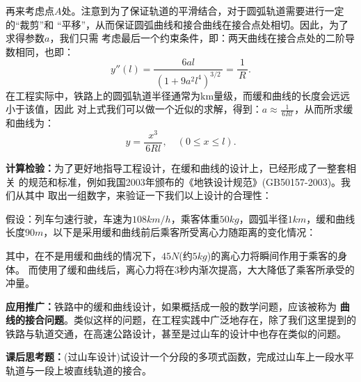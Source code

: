 \documentclass[a4paper]{article}
\newcommand*{\df}[2]{\displaystyle\frac{\,{#1}\,}{\,{#2}\,}}
\begin{document}
再来考虑点$A$处。注意到为了保证轨道的平滑结合，对于圆弧轨道需要进行一定的“裁剪”和
“平移”，从而保证圆弧曲线和接合曲线在接合点处相切。因此，为了求得参数$a$，我们只需
考虑最后一个约束条件，即：两天曲线在接合点处的二阶导数相同，也即：
$$y''(l)=\df{6al}{(1+9a^2l^4)^{3/2}}=\df 1R.$$
在工程实际中，铁路上的圆弧轨道半径通常为km量级，而缓和曲线的长度会远远小于该值，因此
对上式我们可以做一个近似的求解，得到：$a\approx \df 1{6Rl}$，从而所求缓和曲线为：
$$y=\df{x^3}{6Rl},\quad(0\leq x\leq l).$$

{\bf 计算检验：}为了更好地指导工程设计，在缓和曲线的设计上，已经形成了一整套相关
的规范和标准，例如我国2003年颁布的《地铁设计规范》(GB50157-2003)。我们从其中
取出一组数字，来验证一下我们以上设计的合理性：

假设：列车匀速行驶，车速为$108km/h$，乘客体重$50kg$，圆弧半径$1km$，缓和曲线
长度$90m$，以下是采用缓和曲线前后乘客所受离心力随距离的变化情况：
\begin{center}
	\quad
\end{center}
其中，在不是用缓和曲线的情况下，$45N$(约$5kg$)的离心力将瞬间作用于乘客的身体。
而使用了缓和曲线后，离心力将在3秒内渐次提高，大大降低了乘客所承受的冲量。

{\bf 应用推广：}铁路中的缓和曲线设计，如果概括成一般的数学问题，应该被称为
{\bf 曲线的接合问题}。类似这样的问题，在工程实践中广泛地存在，除了我们这里提到的
铁路与轨道交通，在高速公路设计，甚至是过山车的设计中也存在类似的问题。

{\bf 课后思考题：}(过山车设计)试设计一个分段的多项式函数，完成过山车上一段水平轨道与一段上坡直线轨道的接合。
\end{document}
